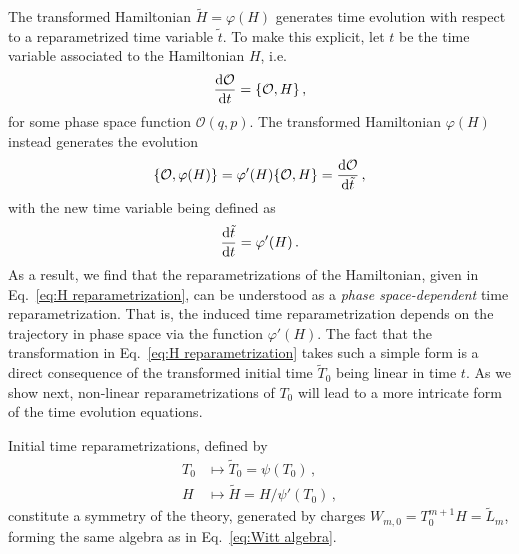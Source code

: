 \documentclass[twocolumn,notitlepage,superscriptaddress, nofootinbib,nobibnotes, aps,prd,10pt]{revtex4-1}%
\begin{document}
The transformed Hamiltonian $\tilde{H} = \varphi(H)$ generates time evolution with respect to a reparametrized time variable $\tilde{t}$. To make this explicit, let $t$ be the time variable associated to the Hamiltonian $H$, i.e. 
%
\begin{equation}
\dv{\mathcal{O}}{t} = \{\mathcal{O},H\}\, ,
\end{equation}
%
for some phase space function $\mathcal{O}(q,p)$. The transformed Hamiltonian $\varphi(H)$ instead generates the evolution
%
\begin{equation}
\{\mathcal{O},\varphi(H)\} = \varphi'(H)\{\mathcal{O},H\} = \dv{\mathcal{O}}{\tilde{t}}\, ,
\end{equation}
%
with the new time variable being defined as
%
\begin{equation}\label{eq:change of clocks}
\dv{\tilde{t}}{t} = \varphi'(H)\, .
\end{equation}
%
As a result, we find that the reparametrizations of the Hamiltonian, given in Eq.~\eqref{eq:H reparametrization}, can be understood as a \textit{phase space-dependent} time reparametrization. That is, the induced time reparametrization depends on the trajectory in phase space via the function $\varphi'(H)$. The fact that the transformation in Eq.~\eqref{eq:H reparametrization} takes such a simple form is a direct consequence of the transformed initial time $\tilde{T}_0$ being linear in time $t$. As we show next, non-linear reparametrizations of $T_0$ will lead to a more intricate form of the time evolution equations. 

Initial time reparametrizations, defined by
%
\begin{subequations}\label{eq:T0 reparametrization}
\begin{align}
    T_0&\mapsto \tilde{T}_0 = \psi(T_0)\, ,\\[7pt]
    H&\mapsto \tilde{H} = H/\psi'(T_0)\, ,\label{eq:T0 reparam: H}
\end{align}
\end{subequations}
%
constitute a symmetry of the theory, generated by charges $W_{m,0} = T_0^{m+1}H=\tilde{L}_m$, forming the same algebra as in Eq.~\eqref{eq:Witt algebra}.
\end{document}
